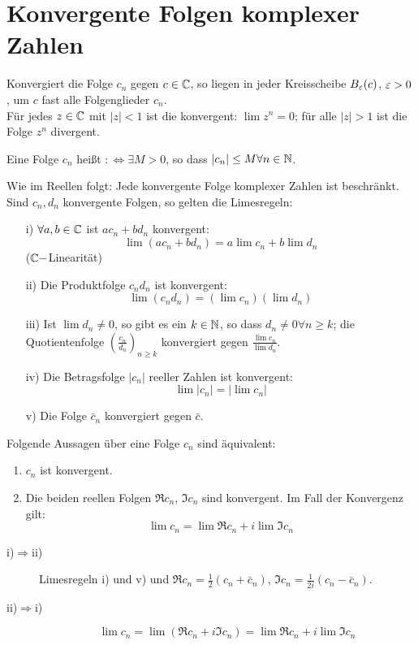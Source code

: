 \section{Konvergente Folgen komplexer Zahlen}
Konvergiert die Folge $ c_n $ gegen $ c\in\mathbb{C} $, so liegen in jeder Kreisscheibe $ B_\varepsilon(c) $, $ \varepsilon>0 $, um $ c $ fast alle Folgenglieder $ c_n $.\\ F\"ur jedes $ z\in\mathbb{C} $ mit $ |z|<1 $ ist die  konvergent: $ \lim z^n=0 $; f\"ur alle $ |z|>1 $ ist die Folge $ z^n $ divergent.\\
\begin{definition}
Eine Folge $ c_n $ hei\ss t $ :\Leftrightarrow\exists M>0 $, so dass $ |c_n|\leq M\forall n\in\mathbb{N} $.\\
\end{definition}
Wie im Reellen folgt:
Jede konvergente Folge komplexer Zahlen ist beschr\"ankt. Sind $ c_n,d_n $ konvergente Folgen, so gelten die Limesregeln:
\begin{enumerate}
\item[i)] $ \forall a,b\in\mathbb{C} $ ist $ ac_n+bd_n $ konvergent:
\[ \lim(ac_n+bd_n)=a\lim c_n+b\lim d_n \]
($ \mathbb{C}- $Linearit\"at)
\item[ii)] Die Produktfolge $ c_nd_n $ ist konvergent:
\[ \lim(c_nd_n)=(\lim c_n)(\lim d_n) \] 
\item[iii)] Ist $ \lim d_n\neq 0 $, so gibt es ein $ k\in\mathbb{N} $, so dass $ d_n\neq 0\forall n\geq k $; die Quotientenfolge $ \left(\frac{c_n}{d_n}\right)_{n\geq k} $ konvergiert gegen $ \frac{\lim c_n}{\lim d_n} $.
\item[iv)] Die Betragsfolge $ |c_n| $ reeller Zahlen ist konvergent:
\[ \lim |c_n|=|\lim c_n| \]
\item[v)] Die Folge $ \bar c_n $ konvergiert gegen $ \bar c $.
\end{enumerate}
\begin{satz}
Folgende Aussagen \"uber eine Folge $ c_n $ sind \"aquivalent:
\begin{enumerate}
\item $ c_n $ ist konvergent.
\item Die beiden reellen Folgen $ \Re c_n $, $ \Im c_n $ sind konvergent.
Im Fall der Konvergenz gilt:
\[ \lim c_n=\lim\Re c_n+i\lim\Im c_n \]
\end{enumerate}
\end{satz}
\begin{beweis}
\begin{description}
\item[i)$ \Rightarrow $ii)] Limesregeln i) und v) und $ \Re c_n=\frac{1}{2}(c_n+\bar c_n) $, $ \Im c_n=\frac{1}{2i}(c_n-\bar c_n) $.
\item[ii)$ \Rightarrow $i)] \[ \lim c_n=\lim(\Re c_n+i\Im c_n)=\lim\Re c_n+i\lim\Im c_n \]
\end{description}
\end{beweis}
